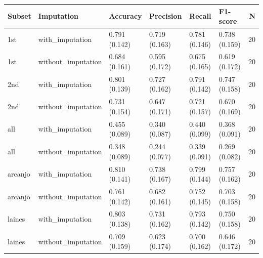 \begin{tabular}{llllllr}
\toprule
 Subset &         Imputation &      Accuracy &     Precision &        Recall &      F1-score &  N \\
\midrule
    1st &    with_imputation & 0.791 (0.142) & 0.719 (0.163) & 0.781 (0.146) & 0.738 (0.159) & 20 \\
    1st & without_imputation & 0.684 (0.161) & 0.595 (0.172) & 0.675 (0.165) & 0.619 (0.172) & 20 \\
    2nd &    with_imputation & 0.801 (0.139) & 0.727 (0.162) & 0.791 (0.142) & 0.747 (0.158) & 20 \\
    2nd & without_imputation & 0.731 (0.154) & 0.647 (0.171) & 0.721 (0.157) & 0.670 (0.169) & 20 \\
    all &    with_imputation & 0.455 (0.089) & 0.340 (0.087) & 0.440 (0.099) & 0.368 (0.091) & 20 \\
    all & without_imputation & 0.348 (0.089) & 0.244 (0.077) & 0.339 (0.091) & 0.269 (0.082) & 20 \\
arcanjo &    with_imputation & 0.810 (0.141) & 0.738 (0.167) & 0.799 (0.144) & 0.757 (0.162) & 20 \\
arcanjo & without_imputation & 0.761 (0.142) & 0.682 (0.161) & 0.752 (0.145) & 0.703 (0.158) & 20 \\
 laines &    with_imputation & 0.803 (0.138) & 0.731 (0.162) & 0.793 (0.142) & 0.750 (0.158) & 20 \\
 laines & without_imputation & 0.709 (0.159) & 0.623 (0.174) & 0.700 (0.162) & 0.646 (0.172) & 20 \\
\bottomrule
\end{tabular}
